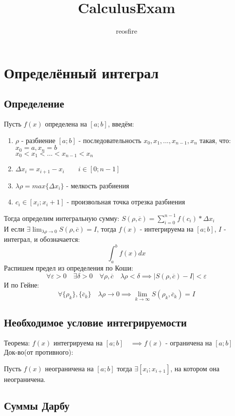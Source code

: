 \documentclass[11pt]{article}
\title{CalculusExam}
\author{reosfire}
\begin{document}
    \section{Определённый интеграл}
        \subsection{Определение}
        Пусть $f(x)$ определена на $[a; b]$, введём:
        \begin{enumerate}
            \item $\rho$ - разбиение $[a; b]$ - последовательность $x_0, x_1, ..., x_{n - 1}, x_n$ такая, что:\\
             $x_0 = a, x_n = b$\\
             $x_0 < x_1 < ... < x_{n - 1} < x_n$
            \item $\Delta x_i = x_{i + 1} - x_i \qquad i \in[0; n - 1]$
            \item $\lambda \rho = max\{\Delta x_i\}$ - мелкость разбиения
            \item $c_i \in [x_i; x_i + 1]$ - произвольная точка отрезка разбиения
        \end{enumerate}
        Тогда определим интегральную сумму:
        $S(\rho, \overline{c}) = \sum_{i=0}^{n-1} f(c_i)*\Delta x_i$\\
        И если $\exists \lim_{\lambda \rho \to 0} S(\rho, \overline{c}) = I$,
        тогда $f(x)$ - интегрируема на $[a; b]$, $I$ - интеграл, и обозначается: \[\int_{a}^{b}f(x)dx\]
        Распишем предел из определения по Коши:
        \[\forall \varepsilon > 0 \quad \exists \delta > 0 \quad \forall \rho, \overline{c} \quad \lambda\rho < \delta \implies |S(\rho, \overline{c}) - I| < \varepsilon\]
        И по Гейне:
        \[\forall \{\rho_k\}, \{\overline{c}_k\} \quad \lambda\rho \to 0 \implies \lim_{k \to \infty} S(\rho_k, \overline{c}_k) = I\]

        \subsection{Необходимое условие интегрируемости}
        Теорема: $f(x)$ интегрируема на $[a; b] \quad \implies f(x)$ - ограничена на $[a; b]$\\
        Док-во(от противного):

        Пусть $f(x)$ неограничена на $[a; b]$ тогда $\exists [x_i; x_{i + 1}]$, на котором она неограничена.

        \subsection{Суммы Дарбу}
\end{document}
